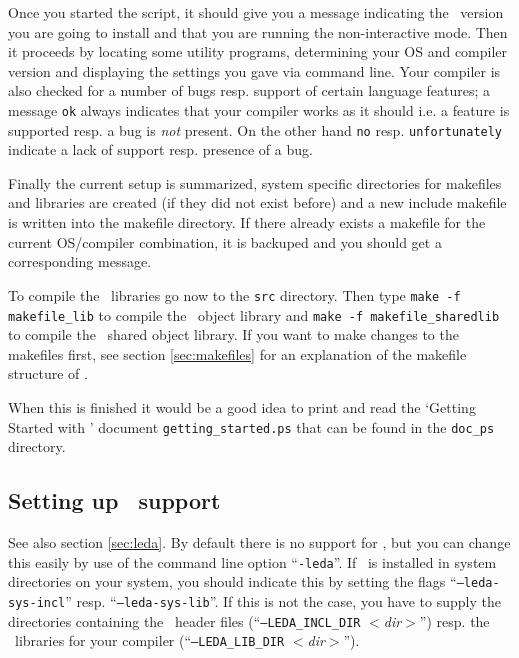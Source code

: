 Once you started the script, it should give you a message indicating
the \cgal\ version you are going to install and that you are running
the non-interactive mode. Then it proceeds by locating some utility
programs, determining your OS and compiler version and displaying the
settings you gave via command line. Your compiler is also checked for
a number of bugs resp. support of certain language features; a message
\texttt{ok} always indicates that your compiler works as it should
i.e. a feature is supported resp. a bug is \textit{not} present. On
the other hand \texttt{no} resp.  \texttt{unfortunately} indicate a
lack of support resp. presence of a bug.

Finally the current setup is summarized, system specific directories
for makefiles and libraries are created (if they did not exist before)
and a new include makefile is written into the makefile directory. If
there already exists a makefile for the current OS/compiler
combination, it is backuped and you should get a corresponding
message.

To compile the \cgal\ libraries go now to the \texttt{src} directory.
Then type \texttt{make -f makefile\_lib} to compile the \cgal\ object
library and \texttt{make -f makefile\_sharedlib} to compile the \cgal\ 
shared object library. If you want to make changes to the makefiles
first, see section \ref{sec:makefiles} for an explanation of the
makefile structure of \cgal.

When this is finished it would be a good idea to print and read the
`Getting Started with \cgal' document \texttt{getting\_started.ps}
that can be found in the \texttt{doc\_ps} directory.

\subsection{Setting up \leda\ support}\label{sec:leda-setup}

See also section \ref{sec:leda}. By default there is no support for
\leda, but you can change this easily by use of the command line
option ``\texttt{-leda}''. If \leda\ is installed in system
directories on your system, you should indicate this by setting the
flags ``{\tt --leda-sys-incl}'' resp.  ``\texttt{--leda-sys-lib}''. If
this is not the case, you have to supply the directories containing
the \leda\ header files (``\texttt{--LEDA\_INCL\_DIR}
\textit{$<$dir$>$}'') resp. the \leda\ libraries for your compiler
(``\texttt{--LEDA\_LIB\_DIR} {\it $<$dir$>$}'').

